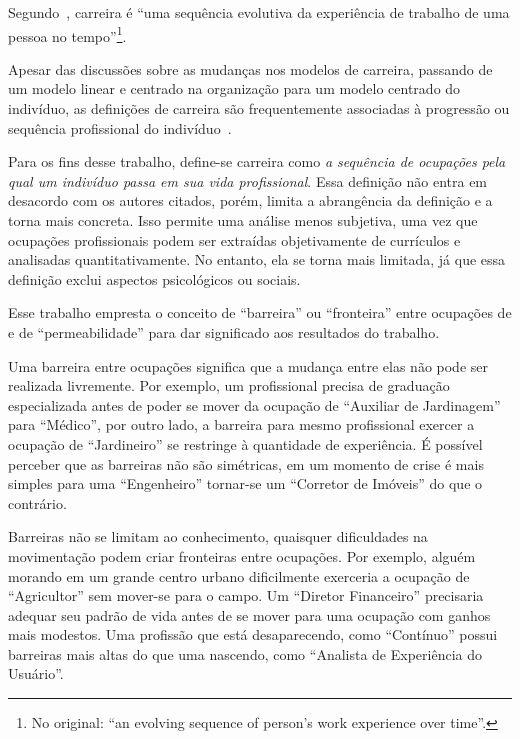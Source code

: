 \documentclass[
  article,
  11pt,
  a4paper,
  english,
  brazil,
  sumario=tradicional]{abntex2}
\begin{document}
Segundo~, carreira é \foreignquote{english}{uma sequência evolutiva da experiência de trabalho de uma pessoa no tempo}\footnote{No original: \enquote{an evolving sequence of person's work experience over time}.}.

Apesar das discussões sobre as mudanças nos modelos de carreira, passando de um modelo linear e centrado na organização para um modelo centrado do indivíduo, as definições de carreira são frequentemente associadas à progressão ou sequência profissional do indivíduo~\cite{Baruch2004-oy,Sullivan2009-xb,Bendassolli2009-bg}.

Para os fins desse trabalho, define-se carreira como \textit{a sequência de ocupações pela qual um indivíduo passa em sua vida profissional}. Essa definição não entra em desacordo com os autores citados, porém, limita a abrangência da definição e a torna mais concreta. Isso permite uma análise menos subjetiva, uma vez que ocupações profissionais podem ser extraídas objetivamente de currículos e analisadas quantitativamente. No entanto, ela se torna mais limitada, já que essa definição exclui aspectos psicológicos ou sociais.

Esse trabalho empresta o conceito de \enquote{barreira} ou \enquote{fronteira} entre ocupações de  e de \enquote{permeabilidade} para dar significado aos resultados do trabalho.

Uma barreira entre ocupações significa que a mudança entre elas não pode ser realizada livremente. Por exemplo, um profissional precisa de graduação especializada antes de poder se mover da ocupação de \enquote{Auxiliar de Jardinagem} para \enquote{Médico}, por outro lado, a barreira para mesmo profissional exercer a ocupação de \enquote{Jardineiro} se restringe à quantidade de experiência. É possível perceber que as barreiras não são simétricas, em um momento de crise é mais simples para uma \enquote{Engenheiro} tornar-se um \enquote{Corretor de Imóveis} do que o contrário.

Barreiras não se limitam ao conhecimento, quaisquer dificuldades na movimentação podem criar fronteiras entre ocupações. Por exemplo, alguém morando em um grande centro urbano dificilmente exerceria a ocupação de \enquote{Agricultor} sem mover-se para o campo. Um \enquote{Diretor Financeiro} precisaria adequar seu padrão de vida antes de se mover para uma ocupação com ganhos mais modestos. Uma profissão que está desaparecendo, como \enquote{Contínuo} possui barreiras mais altas do que uma nascendo, como \enquote{Analista de Experiência do Usuário}.
\end{document}
